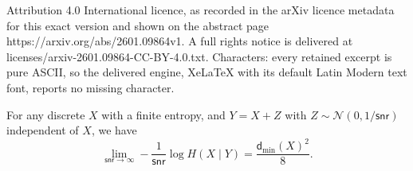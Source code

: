 \documentclass[10pt,a4paper]{amsart}
\newcommand{\calN}{\mathcal{N}}
\newcommand{\dmin}{\mathsf{d}_{\min}}
\newcommand{\snr}{\mathsf{snr}}
\begin{document}
Attribution 4.0 International licence, as recorded in the arXiv licence metadata for this exact version and shown on the abstract page https://arxiv.org/abs/2601.09864v1. A full rights notice is delivered at licenses/arxiv-2601.09864-CC-BY-4.0.txt. Characters: every retained excerpt is pure ASCII, so the delivered engine, XeLaTeX with its default Latin Modern text font, reports no missing character.
	\begin{lemma} For any discrete $X$ with a finite entropy, and $Y = X + Z$ with $Z \sim \calN(0,1/\snr)$ independent of $X$, we have
		\begin{equation*}
			\lim_{\snr \to \infty} - \frac{1}{\snr} \log H(X \mid Y) = \frac{\dmin(X)^2}{8}.
		\end{equation*} \label{lem: cond_ent}
	\end{lemma}
\end{document}
